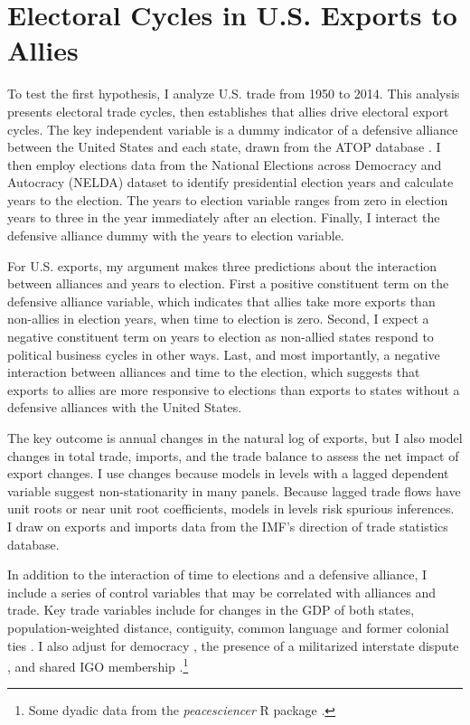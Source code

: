 \documentclass[12pt]{article}
\begin{document}
\section{Electoral Cycles in U.S. Exports to Allies}

To test the first hypothesis, I analyze U.S. trade from 1950 to 2014. 
This analysis presents electoral trade cycles, then establishes that allies drive electoral export cycles.
The key independent variable is a dummy indicator of a defensive alliance between the United States and each state, drawn from the ATOP database \citep{Leedsetal2002}.
I then employ elections data from the National Elections across Democracy and Autocracy (NELDA) dataset \citep{HydeMarinov2012} to identify presidential election years and calculate years to the election.
The years to election variable ranges from zero in election years to three in the year immediately after an election.
Finally, I interact the defensive alliance dummy with the years to election variable.


For U.S. exports, my argument makes three predictions about the interaction between alliances and years to election. 
First a positive constituent term on the defensive alliance variable, which indicates that allies take more exports than non-allies in election years, when time to election is zero.
Second, I expect a negative constituent term on years to election as non-allied states respond to political business cycles in other ways.
Last, and most importantly, a negative interaction between alliances and time to the election, which suggests that exports to allies are more responsive to elections than exports to states without a defensive alliances with the United States.


The key outcome is annual changes in the natural log of exports, but I also model changes in total trade, imports, and the trade balance to assess the net impact of export changes.
I use changes because models in levels with a lagged dependent variable suggest non-stationarity in many panels. 
Because lagged trade flows have unit roots or near unit root coefficients, models in levels risk spurious inferences.
I draw on exports and imports data from the IMF's direction of trade statistics database.


In addition to the interaction of time to elections and a defensive alliance, I include a series of control variables that may be correlated with alliances and trade. 
Key trade variables include for changes in the GDP of both states, population-weighted distance, contiguity, common language and former colonial ties \citep{FouquinHugot2016}.
I also adjust for democracy \citep{Marquez2016}, the presence of a militarized interstate dispute \citep{Gibleretal2016}, and shared IGO membership \citep{Pevehouseetal2020}.\footnote{Some dyadic data from the \textit{peacesciencer} \textsf{R} package \citep{peacesciencer-package}.}
\end{document}
